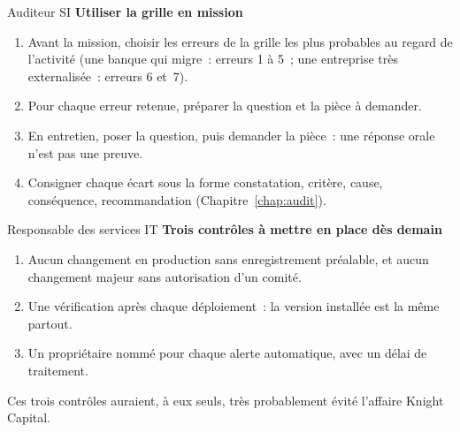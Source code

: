 \begin{boxmetier}{Auditeur SI}
\textbf{Utiliser la grille en mission}
\begin{enumerate}
    \item Avant la mission, choisir les erreurs de la grille les plus
          probables au regard de l'activité (une banque qui migre~:
          erreurs 1 à 5~; une entreprise très externalisée~: erreurs 6
          et~7).
    \item Pour chaque erreur retenue, préparer la question et la pièce à
          demander.
    \item En entretien, poser la question, puis demander la pièce~:
          une réponse orale n'est pas une preuve.
    \item Consigner chaque écart sous la forme constatation, critère,
          cause, conséquence, recommandation
          (Chapitre~\ref{chap:audit}).
\end{enumerate}
\end{boxmetier}

\begin{boxmetier}{Responsable des services IT}
\textbf{Trois contrôles à mettre en place dès demain}
\begin{enumerate}
    \item Aucun changement en production sans enregistrement préalable, et
          aucun changement majeur sans autorisation d'un comité.
    \item Une vérification après chaque déploiement~: la version installée
          est la même partout.
    \item Un propriétaire nommé pour chaque alerte automatique, avec un
          délai de traitement.
\end{enumerate}
Ces trois contrôles auraient, à eux seuls, très probablement évité
l'affaire Knight Capital.
\end{boxmetier}

\separateur

